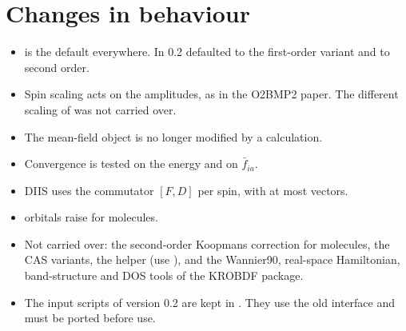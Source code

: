 \section*{Changes in behaviour}

\begin{itemize}
  \item {} is the default everywhere. In 0.2 
        defaulted to the first-order variant and  to second
        order.
  \item Spin scaling acts on the amplitudes, as in the O2BMP2 paper. The
        different scaling of  was not carried over.
  \item The mean-field object is no longer modified by a calculation.
  \item Convergence is tested on the energy and on $\bar f_{ia}$.
  \item DIIS uses the commutator $[F,D]$ per spin, with at most
         vectors.
  \item {} orbitals raise  for molecules.
  \item Not carried over: the second-order Koopmans correction
         for molecules, the CAS variants, the
         helper (use ), and the
        Wannier90, real-space Hamiltonian, band-structure and DOS tools of the
        KROBDF package.
  \item The input scripts of version 0.2 are kept in
        . They use the old interface and must be
        ported before use.
\end{itemize}
